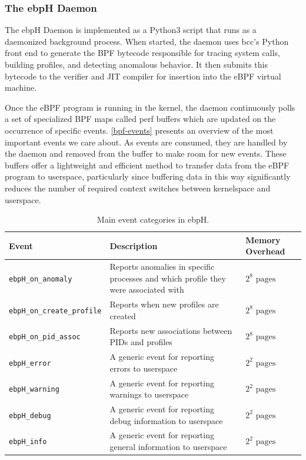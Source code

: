 \documentclass[
  12pt]{findlay}
\begin{document}
\hypertarget{the-ebph-daemon}{%
\subsubsection{The ebpH Daemon}\label{the-ebph-daemon}}

The ebpH Daemon is implemented as a Python3 script that runs as a
daemonized background process. When started, the daemon uses bcc's
Python front end \autocite{bcc} to generate the BPF bytecode responsible
for tracing system calls, building profiles, and detecting anomalous
behavior. It then submits this bytecode to the verifier and JIT compiler
for insertion into the eBPF virtual machine.

Once the eBPF program is running in the kernel, the daemon continuously
polls a set of specialized BPF maps called perf buffers which are
updated on the occurrence of specific events. \autoref{bpf-events}
presents an overview of the most important events we care about. As
events are consumed, they are handled by the daemon and removed from the
buffer to make room for new events. These buffers offer a lightweight
and efficient method to transfer data from the eBPF program to
userspace, particularly since buffering data in this way significantly
reduces the number of required context switches between kernelspace and
userspace.

\begin{table}
\caption{Main event categories in ebpH.}
\label{bpf-events}
\begin{center}
\begin{tabular}{|l|p{2.6in}|l|}
\hline
\textbf{Event} & \textbf{Description} & \textbf{Memory Overhead}\footnotemark\\
\hline
\hline
\texttt{ebpH\_on\_anomaly} & Reports anomalies in specific processes
and which profile they were associated with & $2^{8} \text{ pages}$\\
\hline
\texttt{ebpH\_on\_create\_profile} & Reports when new profiles are created & $2^{8} \text{ pages}$\\
\hline
\texttt{ebpH\_on\_pid\_assoc} & Reports new associations between PIDs and profiles & $2^{8} \text{ pages}$\\
\hline
\texttt{ebpH\_error} & A generic event for reporting errors to userspace & $2^{2} \text{ pages}$\\
\hline
\texttt{ebpH\_warning} & A generic event for reporting warnings to userspace & $2^{2} \text{ pages}$\\
\hline
\texttt{ebpH\_debug} & A generic event for reporting debug information to userspace & $2^{2} \text{ pages}$\\
\hline
\texttt{ebpH\_info} & A generic event for reporting general information to userspace & $2^{2} \text{ pages}$\\
\hline
\end{tabular}
\end{center}
\end{table}
\end{document}
